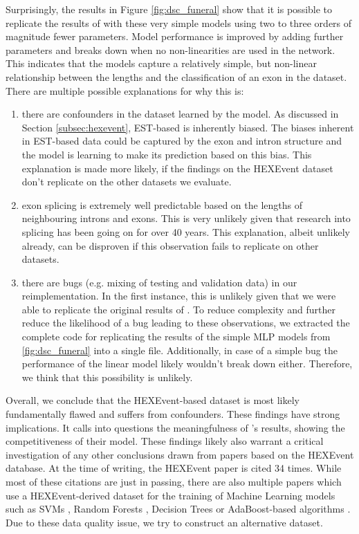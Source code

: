 Surprisingly, the results in Figure \ref{fig:dsc_funeral} show that it is possible to replicate the results of \cite{dsc} with these very simple models using two to three orders of magnitude fewer parameters. Model performance is improved by adding further parameters and breaks down when no non-linearities are used in the network. This indicates that the models capture a relatively simple, but non-linear relationship between the lengths and the classification of an exon in the dataset. 
There are multiple possible explanations for why this is:
\begin{enumerate}
	\item there are confounders in the dataset learned by the model. As discussed in Section \ref{subsec:hexevent}, EST-based is inherently biased. The biases inherent in EST-based data could be captured by the exon and intron structure and the model is learning to make its prediction based on this bias. This explanation is made more likely, if the findings on the HEXEvent dataset don't replicate on the other datasets we evaluate.
	\item exon splicing is extremely well predictable based on the lengths of neighbouring introns and exons. This is very unlikely given that research into splicing has been going on for over 40 years. This explanation, albeit unlikely already, can be disproven if this observation fails to replicate on other datasets.
	\item there are bugs (e.g. mixing of testing and validation data) in our reimplementation. In the first instance, this is unlikely given that we were able to replicate the original results of \cite{dsc}. To reduce complexity and further reduce the likelihood of a bug leading to these observations, we extracted the complete code for replicating the results of the simple MLP models from \ref{fig:dsc_funeral} into a single file. Additionally, in case of a simple bug the performance of the linear model likely wouldn't break down either. Therefore, we think that this possibility is unlikely. 
\end{enumerate}

Overall, we conclude that the HEXEvent-based dataset is most likely fundamentally flawed and suffers from confounders.
These findings have strong implications. It calls into questions the meaningfulness of \cite{dsc}'s results, showing the competitiveness of their model. These findings likely also warrant a critical investigation of any other conclusions drawn from papers based on the HEXEvent database. At the time of writing, the HEXEvent paper is cited 34 times. While most of these citations are just in passing, there are also multiple papers which use a HEXEvent-derived dataset for the training of Machine Learning models such as SVMs \cite{buschhertel}, Random Forests \cite{flawed1} \cite{flawed4}, Decision Trees \cite{flawed2} or AdaBoost-based algorithms \cite{flawed3}. Due to these data quality issue, we try to construct an alternative dataset.


